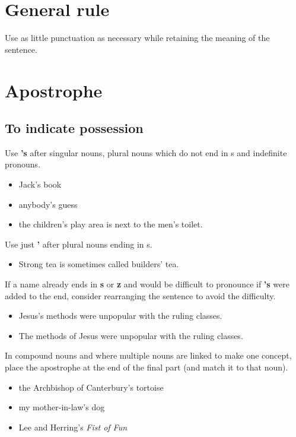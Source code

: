 \documentclass[11pt,a4paper]{book}
\newcommand{\cmark}{{\color{green(html/cssgreen)}\checkmark}}%
\begin{document}
		\section{General rule}
		Use as little punctuation as necessary while retaining the meaning of the sentence.
		\section{Apostrophe}
			\subsection{To indicate possession}
			Use \textbf{'s} after singular nouns, plural nouns which do not end in s and indefinite pronouns.
			{\firasans \begin{mdframed}[backgroundcolor=aliceblue] \begin{itemize}[label=\cmark]
				\item Jack's book
				\item anybody's guess
				\item the children's play area is next to the men's toilet.
			\end{itemize} \end{mdframed} }
			Use just \textbf{'} after plural nouns ending in s.
			{\firasans \begin{mdframed}[backgroundcolor=aliceblue] \begin{itemize}[label=\cmark]
				\item Strong tea is sometimes called builders' tea.
			\end{itemize} \end{mdframed} }
			If a name already ends in \textbf{s} or \textbf{z} and would be difficult to pronounce if \textbf{'s} were added to the end, consider rearranging the sentence to avoid the difficulty.
			{\firasans \begin{mdframed}[backgroundcolor=aliceblue] \begin{itemize}[label=\cmark]
				\item Jesus's methods were unpopular with the ruling classes.
				\item[OR \cmark] The methods of Jesus were unpopular with the ruling classes.
			\end{itemize} \end{mdframed} }
			\newpage
			In compound nouns and where multiple nouns are linked to make one concept, place the apostrophe at the end of the final part (and match it to that noun).
			{\firasans \begin{mdframed}[backgroundcolor=aliceblue] \begin{itemize}[label=\cmark]
				\item the Archbishop of Canterbury's tortoise
				\item my mother-in-law's dog
				\item Lee and Herring's \textit{Fist of Fun}
			\end{itemize} \end{mdframed} }
\end{document}
